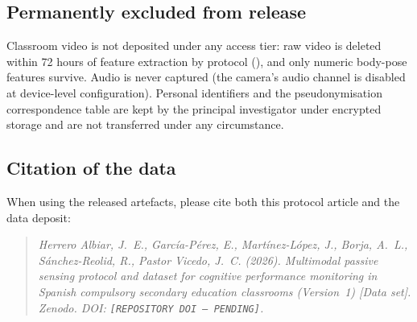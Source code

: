 \subsection*{Permanently excluded from release}

Classroom video is not deposited under any access tier: raw video is deleted within 72 hours of feature extraction by protocol (), and only numeric body-pose features survive. Audio is never captured (the camera's audio channel is disabled at device-level configuration). Personal identifiers and the pseudonymisation correspondence table are kept by the principal investigator under encrypted storage and are not transferred under any circumstance.

\subsection*{Citation of the data}

When using the released artefacts, please cite both this protocol article and the data deposit:

\begin{quote}\small\itshape
Herrero Albiar, J.~E., García-Pérez, E., Martínez-López, J., Borja, A.~L., Sánchez-Reolid, R., Pastor Vicedo, J.~C. (2026). Multimodal passive sensing protocol and dataset for cognitive performance monitoring in Spanish compulsory secondary education classrooms (Version~1) [Data set]. Zenodo. DOI: \texttt{[REPOSITORY DOI --- PENDING]}.
\end{quote}
